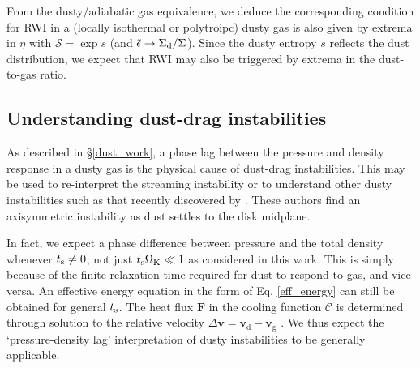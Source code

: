 From the dusty/adiabatic gas equivalence, we deduce the corresponding
condition for RWI in a (locally isothermal or polytroipc) dusty gas is
also given by extrema in $\eta$ with $\mathcal{S} = \exp{s}$ (and
$\tilde{\epsilon}\to \Sigma_\mathrm{d}/\Sigma$). Since
the dusty entropy $s$ reflects the dust distribution, we expect that
RWI may also be triggered by extrema in  the dust-to-gas ratio. 



\subsection{Understanding dust-drag
  instabilities}\label{dust_as_thermo} 

As described in \S\ref{dust_work}, a phase lag between the   
pressure and density response in a dusty gas is the
physical cause of dust-drag instabilities. %
This may be used to re-interpret the streaming instability or to
understand other dusty instabilities such as that recently discovered
by \cite{loren15,loren16}. These authors find an axisymmetric
instability as dust settles to the disk midplane.   





In fact, we expect a phase difference between pressure and the total
density  whenever $t_\mathrm{s}\neq0$; not just $t_\mathrm{s}\Omega_{\rm K}\ll 1$ as 
considered in this work. This is simply because of the finite
relaxation time required for dust to respond to gas, and vice versa. 
An effective energy equation in the form of Eq. \ref{eff_energy} can
still be obtained for general $t_\mathrm{s}$. The
heat flux $\bm{F}$ in the cooling function $\mathcal{C}$ is determined
through solution to the relative velocity $\Delta \bm{v} =
\bm{v}_\mathrm{d}-\bm{v}_\mathrm{g}$ \citep{youdin05,laibe14}.  We
thus expect the `pressure-density lag' interpretation of dusty
instabilities to be generally applicable.    









